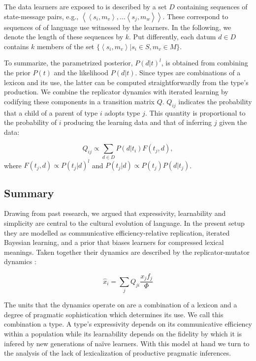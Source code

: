 \documentclass[a4paper]{article}
\newcommand{\tuple}[1]{\ensuremath{\left\langle #1 \right\rangle}}
\begin{document}
The data learners are exposed to is described by a set $D$ containing sequences of state-message pairs, e.g., $\tuple{\tuple{s_i,m_v},...\tuple{s_j,m_w}}$. These correspond to sequences of of language use witnessed by the learners. In the following, we denote the length of these sequences by $k$. Put differently, each datum $d \in D$ contains $k$ members of the set $\{\tuple{s_i,m_v} | s_i \in S, m_v \in M\}$.

To summarize, the parametrized posterior, $P(d|t)^l$, is obtained from combining the prior $P(t)$ and the likelihood $P(d|t)$. Since types are combinations of a lexicon and its use, the latter can be computed straightforwardly from the type's production. We combine the replicator dynamics with iterated learning by codifying these components in a transition matrix $Q$. $Q_{ij}$ indicates the probability that a child of a parent of type $i$ adopts type $j$. This quantity is proportional to the probability of $i$ producing the learning data and that of inferring $j$ given the data: 

\[
 Q_{ij} \propto \sum_{d \in D} P(d|t_i) F(t_j,d),
\]
where $F(t_j,d) \propto P(t_j|d)^l$ and $P(t_j|d) \propto P(t_j) P(d|t_j)$.
 

\subsection{Summary}
Drawing from past research, we argued that expressivity, learnability and simplicity are central to the cultural evolution of language. In the present setup they are modelled as communicative efficiency-relative replication, iterated Bayesian learning, and a prior that biases learners for compressed lexical meanings. Taken together their dynamics are described by the replicator-mutator dynamics \citep{hofbauer+sigmund:2003}: 

\[ 
\hat{x}_i = \sum_j Q_{ji} \frac{x_jf_j}{\Phi}
\]

The units that the dynamics operate on are a combination of a lexicon and a degree of pragmatic sophistication which determines its use. We call this combination a type. A type's expressivity depends on its communicative efficiency within a population while its learnability depends on the fidelity by which it is infered by new generations of na\"ive learners. With this model at hand we turn to the analysis of the lack of lexicalization of productive pragmatic inferences.
\end{document}

